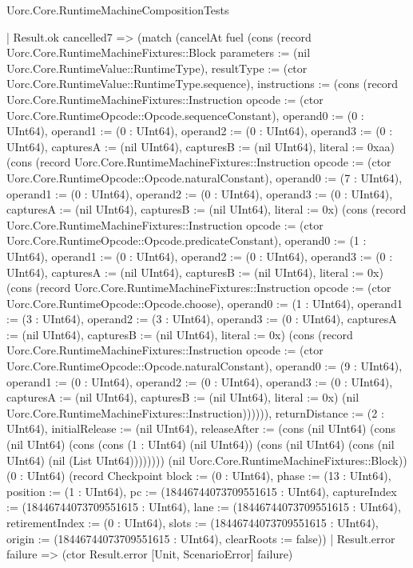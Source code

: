 \begin{lexlean}{Uorc.Core.RuntimeMachineCompositionTests}
\begin{semanticmodule}
{                  | Result.ok cancelled7 => (match (cancelAt fuel (cons (record Uorc.Core.RuntimeMachineFixtures::Block {parameters := (nil Uorc.Core.RuntimeValue::RuntimeType), resultType := (ctor Uorc.Core.RuntimeValue::RuntimeType.sequence), instructions := (cons (record Uorc.Core.RuntimeMachineFixtures::Instruction {opcode := (ctor Uorc.Core.RuntimeOpcode::Opcode.sequenceConstant), operand0 := (0 : UInt64), operand1 := (0 : UInt64), operand2 := (0 : UInt64), operand3 := (0 : UInt64), capturesA := (nil UInt64), capturesB := (nil UInt64), literal := 0xaa}) (cons (record Uorc.Core.RuntimeMachineFixtures::Instruction {opcode := (ctor Uorc.Core.RuntimeOpcode::Opcode.naturalConstant), operand0 := (7 : UInt64), operand1 := (0 : UInt64), operand2 := (0 : UInt64), operand3 := (0 : UInt64), capturesA := (nil UInt64), capturesB := (nil UInt64), literal := 0x}) (cons (record Uorc.Core.RuntimeMachineFixtures::Instruction {opcode := (ctor Uorc.Core.RuntimeOpcode::Opcode.predicateConstant), operand0 := (1 : UInt64), operand1 := (0 : UInt64), operand2 := (0 : UInt64), operand3 := (0 : UInt64), capturesA := (nil UInt64), capturesB := (nil UInt64), literal := 0x}) (cons (record Uorc.Core.RuntimeMachineFixtures::Instruction {opcode := (ctor Uorc.Core.RuntimeOpcode::Opcode.choose), operand0 := (1 : UInt64), operand1 := (3 : UInt64), operand2 := (3 : UInt64), operand3 := (0 : UInt64), capturesA := (nil UInt64), capturesB := (nil UInt64), literal := 0x}) (cons (record Uorc.Core.RuntimeMachineFixtures::Instruction {opcode := (ctor Uorc.Core.RuntimeOpcode::Opcode.naturalConstant), operand0 := (9 : UInt64), operand1 := (0 : UInt64), operand2 := (0 : UInt64), operand3 := (0 : UInt64), capturesA := (nil UInt64), capturesB := (nil UInt64), literal := 0x}) (nil Uorc.Core.RuntimeMachineFixtures::Instruction)))))), returnDistance := (2 : UInt64), initialRelease := (nil UInt64), releaseAfter := (cons (nil UInt64) (cons (nil UInt64) (cons (cons (1 : UInt64) (nil UInt64)) (cons (nil UInt64) (cons (nil UInt64) (nil (List UInt64)))))))}) (nil Uorc.Core.RuntimeMachineFixtures::Block)) (0 : UInt64) (record Checkpoint {block := (0 : UInt64), phase := (13 : UInt64), position := (1 : UInt64), pc := (18446744073709551615 : UInt64), captureIndex := (18446744073709551615 : UInt64), lane := (18446744073709551615 : UInt64), retirementIndex := (0 : UInt64), slots := (18446744073709551615 : UInt64), origin := (18446744073709551615 : UInt64), clearRoots := false}))
                    | Result.error failure => (ctor Result.error [Unit, ScenarioError] failure)
}
\end{semanticmodule}
\end{lexlean}
